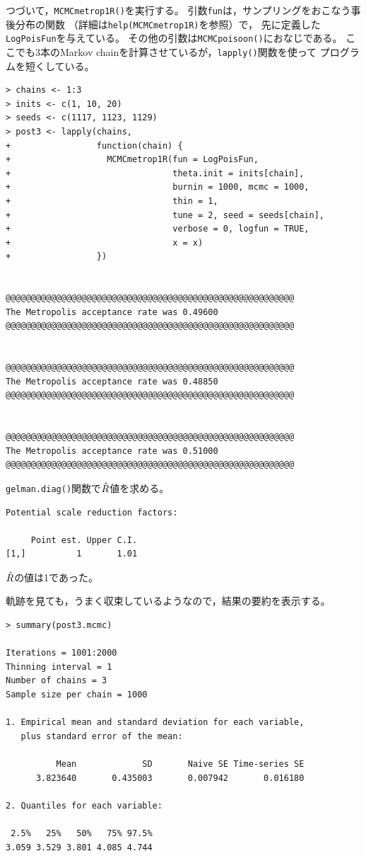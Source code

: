 \documentclass[11pt,uplatex]{jsarticle}
\begin{document}
つづいて，\texttt{MCMCmetrop1R()}を実行する。
引数\texttt{fun}は，サンプリングをおこなう事後分布の関数
（詳細は\texttt{help(MCMCmetrop1R)}を参照）で，
先に定義した\texttt{LogPoisFun}を与えている。
その他の引数は\texttt{MCMCpoisoon()}におなじである。
ここでも3本のMarkov chainを計算させているが，\texttt{lapply()}関数を使って
プログラムを短くしている。

\vspace{1zw}
\begin{lstlisting}
> chains <- 1:3
> inits <- c(1, 10, 20)
> seeds <- c(1117, 1123, 1129)
> post3 <- lapply(chains,
+                 function(chain) {
+                   MCMCmetrop1R(fun = LogPoisFun,
+                                theta.init = inits[chain],
+                                burnin = 1000, mcmc = 1000,
+                                thin = 1,
+                                tune = 2, seed = seeds[chain],
+                                verbose = 0, logfun = TRUE,
+                                x = x)
+                 })


@@@@@@@@@@@@@@@@@@@@@@@@@@@@@@@@@@@@@@@@@@@@@@@@@@@@@@@@@
The Metropolis acceptance rate was 0.49600
@@@@@@@@@@@@@@@@@@@@@@@@@@@@@@@@@@@@@@@@@@@@@@@@@@@@@@@@@


@@@@@@@@@@@@@@@@@@@@@@@@@@@@@@@@@@@@@@@@@@@@@@@@@@@@@@@@@
The Metropolis acceptance rate was 0.48850
@@@@@@@@@@@@@@@@@@@@@@@@@@@@@@@@@@@@@@@@@@@@@@@@@@@@@@@@@


@@@@@@@@@@@@@@@@@@@@@@@@@@@@@@@@@@@@@@@@@@@@@@@@@@@@@@@@@
The Metropolis acceptance rate was 0.51000
@@@@@@@@@@@@@@@@@@@@@@@@@@@@@@@@@@@@@@@@@@@@@@@@@@@@@@@@@
\end{lstlisting}

\vspace{1zw}

\texttt{gelman.diag()}関数で$\Hat{R}$値を求める。
\begin{lstlisting}
Potential scale reduction factors:

     Point est. Upper C.I.
[1,]          1       1.01

\end{lstlisting}
$\Hat{R}$の値は1であった。

軌跡を見ても，うまく収束しているようなので，結果の要約を表示する。
\begin{lstlisting}
> summary(post3.mcmc)

Iterations = 1001:2000
Thinning interval = 1 
Number of chains = 3 
Sample size per chain = 1000 

1. Empirical mean and standard deviation for each variable,
   plus standard error of the mean:

          Mean             SD       Naive SE Time-series SE 
      3.823640       0.435003       0.007942       0.016180 

2. Quantiles for each variable:

 2.5%   25%   50%   75% 97.5% 
3.059 3.529 3.801 4.085 4.744 

\end{lstlisting}
\end{document}
